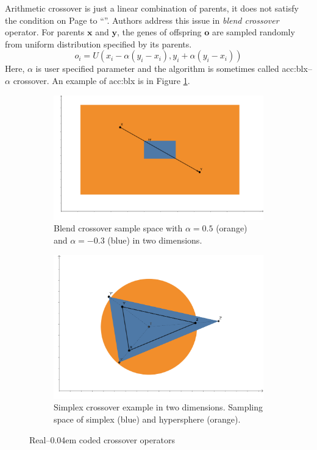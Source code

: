Arithmetic crossover is just a linear combination of parents, it does not satisfy the condition on Page \pageref{enum:espopulationvariance} to \enquote{\snipescondition}. Authors \citet{BlendCrossoverOriginal} address this issue in \emph{blend crossover} operator. For parents $\mathbf{x}$ and $\mathbf{y}$, the genes of offspring $\mathbf{o}$ are sampled randomly from uniform distribution specified by its parents.
$$
o_i = U\left( 
    x_i - \alpha \left( y_i - x_i \right),
    y_i + \alpha \left( y_i - x_i \right)
\right)
$$
Here, $\alpha$ is user specified parameter and the algorithm is sometimes called \acrshort{acc:blx}--$\alpha$ crossover. An example of \acrshort{acc:blx} is in Figure \ref{fig:blendcrossoverexample}.

\begin{figure}
    \begin{subfigure}[t]{0.45\textwidth}
        \includegraphics[width=\textwidth]{img/BLX.pdf}
        \caption{Blend crossover sample space with $\alpha=0.5$ (orange) and $\alpha=-0.3$ (blue) in two dimensions.}
        \label{fig:blendcrossoverexample}
    \end{subfigure}
    \hfill
    \begin{subfigure}[t]{0.45\textwidth}
        \includegraphics[width=\textwidth]{img/SimplexCrossover.pdf}
        \caption{Simplex crossover example in two dimensions. Sampling space of simplex (blue) and hypersphere (orange).}
        \label{fig:simplexcrossoverexample}
    \end{subfigure}
    \caption{Real--\kern0.04em coded crossover operators}
\end{figure}

